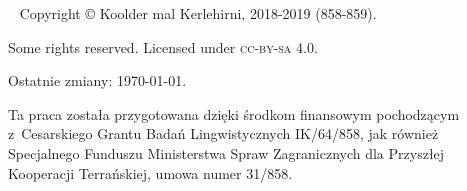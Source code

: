 ~\vfill
\begingroup
\setlength\parindent{0pt}\footnotesize
Copyright © Koolder mal Kerlehirni, 2018-2019 (858-859).

\bigskip

Some rights reserved. Licensed under \textsc{cc-by-sa} 4.0.

Ostatnie zmiany: \today{}.

\medskip

Ta praca została przygotowana dzięki środkom finansowym
pochodzącym z~Cesarskiego Grantu Badań Lingwistycznych IK/64/858,
jak również Specjalnego Funduszu Ministerstwa Spraw Zagranicznych dla
Przyszłej Kooperacji Terrańskiej, umowa numer 31/858.

\endgroup